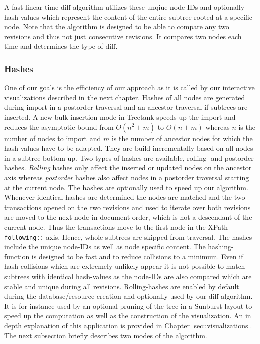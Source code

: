 A fast linear time diff-algorithm utilizes these unqiue node-IDs and optionally hash-values which represent the content of the entire subtree rooted at a specific node. Note that the algorithm is designed to be able to compare any two revisions and thus not just consecutive revisions. It compares two nodes each time and determines the type of diff. 


\subsubsection{Hashes} One of our goals is the efficiency of our approach as it is called by our interactive visualizations described in the next chapter. Hashes of all nodes are generated during import in a postorder-traversal and an ancestor-traversal if subtrees are inserted. A new bulk insertion mode in Treetank speeds up the import and reduces the asymptotic bound from $O(n^2+m)$ to $O(n+m)$ whereas $n$ is the number of nodes to import and $m$ is the number of ancestor nodes for which the hash-values have to be adapted. They are build incrementally based on all nodes in a subtree bottom up. Two types of hashes are available, rolling\cite{Rolling2011}- and postorder\cite{Integrity2010}- hashes. \emph{Rolling} hashes only affect the inserted or updated nodes on the ancestor axis whereas \emph{postorder} hashes also affect nodes in a postorder traversal starting at the current node. The hashes are optionally used to speed up our algorithm. Whenever identical hashes are determined the nodes are matched and the two transactions opened on the two revisions and used to iterate over both revisions are moved to the next node in document order, which is not a descendant of the current node. Thus the transactions move to the first node in the XPath \texttt{following::}-axis. Hence, whole subtrees are skipped from traversal. The hashes include the unique node-IDs as well as node specific content. The hashing-function is designed to be fast and to reduce collisions to a minimum. Even if hash-collisions which are extremely unlikely appear it is not possible to match subtrees with identical hash-values as the node-IDs are also compared which are stable and unique during all revisions. Rolling-hashes are enabled by default during the database/resource creation and optionally used by our diff-algorithm. It is for instance used by an optional pruning of the tree in a Sunburst-layout to speed up the computation as well as the construction of the visualization. An in depth explanation of this application is provided in Chapter \ref{sec::visualizations}. The next subsection briefly describes two modes of the algorithm.


